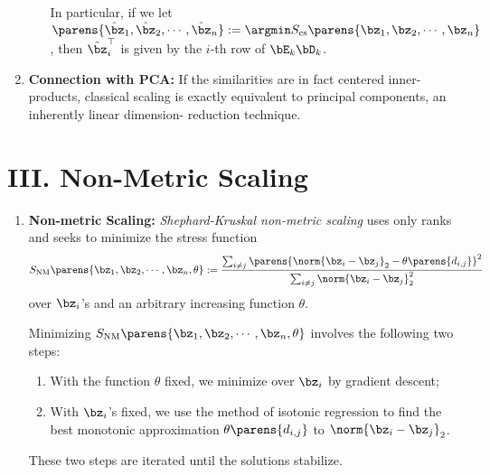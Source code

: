 \documentclass[12pt]{article}
\begin{document}
\begin{enumerate}[label=\textbf{\arabic*.}]
\begin{enumerate}
		In particular, if we let $\parens{\hat{\bz}_1, \hat{\bz}_2, \cdots, \hat{\bz}_n} := \argmin S_{\mathrm{cs}} \parens{\bz_1, \bz_2, \cdots, \bz_n}$, then $\hat{\bz}_i^\top$ is given by the $i$-th row of $\bE_k \bD_k$. 
		
	\end{enumerate}
	
	\item \textbf{Connection with PCA:} If the similarities are in fact centered inner-products, classical scaling is exactly equivalent to principal components, an inherently linear dimension- reduction technique. 
	

\end{enumerate}


\section*{III. Non-Metric Scaling}

\begin{enumerate}[label=\textbf{\arabic*.}]

	\item \textbf{Non-metric Scaling:} \emph{Shephard-Kruskal non-metric scaling} uses only ranks and seeks to minimize the stress function 
	\begin{align*}
		S_{\mathrm{NM}} \parens{\bz_1, \bz_2, \cdots, \bz_n, \theta} := \frac{\sum_{i \neq j} \parens{\norm{\bz_i - \bz_j}_2 - \theta \parens{d_{i,j}}}^2}{\sum_{i \neq j} \norm{\bz_i - \bz_j}_2^2}
	\end{align*}
	over $\bz_i$'s and an arbitrary increasing function $\theta$. 
	
	Minimizing $S_{\mathrm{NM}} \parens{\bz_1, \bz_2, \cdots, \bz_n, \theta}$ involves the following two steps: 
	\begin{enumerate}[label=(\arabic*)]
		\item With the function $\theta$ fixed, we minimize over $\bz_i$ by gradient descent; 
		\item With $\bz_i$'s fixed, we use the method of isotonic regression to find the best monotonic approximation $\theta \parens{d_{i,j}}$ to $\norm{\bz_i - \bz_{j}}_2$. 
	\end{enumerate}
	These two steps are iterated until the solutions stabilize. 

\end{enumerate}


\printbibliography
\end{document}
